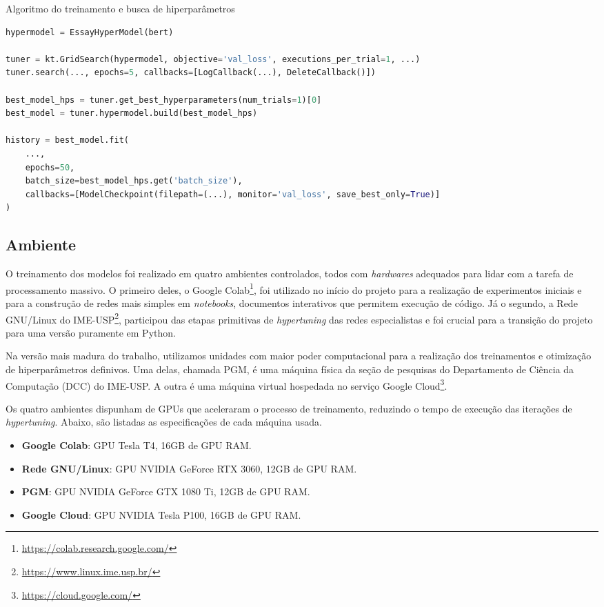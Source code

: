\begin{program}
    \centering
    \caption{Algoritmo do treinamento e busca de hiperparâmetros}
    \label{alg:search-and-train}
\begin{lstlisting}[language=Python]
hypermodel = EssayHyperModel(bert)

tuner = kt.GridSearch(hypermodel, objective='val_loss', executions_per_trial=1, ...)
tuner.search(..., epochs=5, callbacks=[LogCallback(...), DeleteCallback()])

best_model_hps = tuner.get_best_hyperparameters(num_trials=1)[0]
best_model = tuner.hypermodel.build(best_model_hps)

history = best_model.fit(
    ...,
    epochs=50,
    batch_size=best_model_hps.get('batch_size'),
    callbacks=[ModelCheckpoint(filepath=(...), monitor='val_loss', save_best_only=True)]
)
\end{lstlisting}
\end{program}

\subsection{Ambiente}

O treinamento dos modelos foi realizado em quatro ambientes controlados, todos com \textit{hardwares} adequados para lidar com a tarefa de processamento massivo. O primeiro deles, o Google Colab\footnote{\url{https://colab.research.google.com/}}, foi utilizado no início do projeto para a realização de experimentos iniciais e para a construção de redes mais simples em \textit{notebooks}, documentos interativos que permitem execução de código. Já o segundo, a Rede GNU/Linux do IME-USP\footnote{\url{https://www.linux.ime.usp.br/}}, participou das etapas primitivas de \textit{hypertuning} das redes especialistas e foi crucial para a transição do projeto para uma versão puramente em Python.

Na versão mais madura do trabalho, utilizamos unidades com maior poder computacional para a realização dos treinamentos e otimização de hiperparâmetros definivos. Uma delas, chamada PGM, é uma máquina física da seção de pesquisas do Departamento de Ciência da Computação (DCC) do IME-USP. A outra é uma máquina virtual hospedada no serviço Google Cloud\footnote{\url{https://cloud.google.com/}}.

Os quatro ambientes dispunham de GPUs que aceleraram o processo de treinamento, reduzindo o tempo de execução das iterações de \textit{hypertuning}. Abaixo, são listadas as especificações de cada máquina usada.

\begin{itemize}
    \item \textbf{Google Colab}: GPU Tesla T4, 16GB de GPU RAM.
    \item \textbf{Rede GNU/Linux}: GPU NVIDIA GeForce RTX 3060, 12GB de GPU RAM.
    \item \textbf{PGM}: GPU NVIDIA GeForce GTX 1080 Ti, 12GB de GPU RAM.
    \item \textbf{Google Cloud}: GPU NVIDIA Tesla P100, 16GB de GPU RAM.
\end{itemize}
